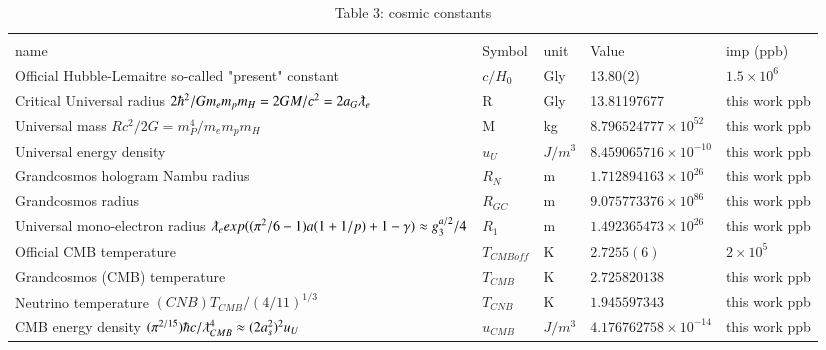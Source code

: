 \documentclass[a4paper,9pt]{article}
\begin{document}
\begin{appendix}
\begin{table}
\begin{tabular}{lllll}
    
    \bottomrule
  \end{tabular}
\end{table}

\begin{table}
\caption{Table 3: cosmic constants}
\label{tab:3:table3}
  \hskip-2.0cm\begin{tabular}{lllll}
    \toprule
    \multicolumn{5}{c}{}                   \\ 
      \cmidrule(r){1-5}
     name & Symbol   & unit   & Value & imp (ppb) \\
 \midrule
   
    
    Official Hubble-Lemaitre so-called "present" constant & $c/H_0$ & Gly & 13.80(2)    & $1.5 \times 10^6$ \\
  
    Critical Universal radius $2\hbar^2/Gm_em_pm_H=2GM/c^2=2a_G\lambdabar_{e}$ & R &  Gly & 13.81197677  & this work ppb\\
   
   Universal mass $Rc^2/2G = m_P^4/m_em_pm_H$ & M & kg & $8.796524777 \times 10^{52}$ & this work ppb \\ 
   
   Universal energy density & $u_U$ & $J/m^3$ & $8.459065716 \times 10^{-10}$ & this work ppb \\
   
   Grandcosmos hologram Nambu radius & $R_N$ &  m & $1.712894163 \times 10^{26}$ & this work ppb\\
   
   Grandcosmos radius & $R_{GC}$ &  m & $9.075773376 \times 10^{86}$ & this work ppb \\
   
   Universal mono-electron radius $\lambdabar_e exp((\pi^2/6-1)a(1+1/p)+1-\gamma)\approx g_3^{a/2}/4$ & $R_1$ &  m & $1.492365473 \times 10^{26}$ & this work ppb \\
    
     Official CMB temperature & $T_{CMBoff}$ & K & $2.7255(6)$ & $2 \times 10^5$ \\
    
   Grandcosmos (CMB) temperature & $T_{CMB}$ & K & $2.725820138$ & this work ppb \\
   
 Neutrino temperature  $(CNB)T_{CMB}/ (4/11)^{1/3}$ & $T_{CNB}$ & K & $1.945597343$ & this work ppb \\
 
 CMB energy density $(\pi^{2/15})\hbar c/ \lambdabar_{CMB}^4 \approx (2a_s^2)^2 u_U$ & $u_{CMB}$ & $J/m^3$ & $4.176762758 \times 10^{-14}$ & this work ppb\\
 

\end{tabular}
\end{table}
\end{appendix}
\end{document}
